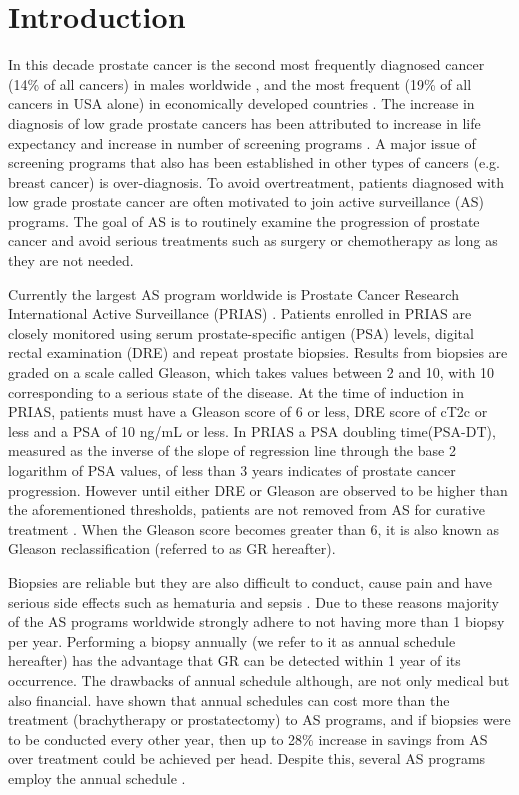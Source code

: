 \section{Introduction}
\label{sec : introduction}
In this decade prostate cancer is the second most frequently diagnosed cancer (14\% of all cancers) in males worldwide \citep{GlobalCancerStats2012}, and the most frequent (19\% of all cancers in USA alone) in economically developed countries \citep*{USACancerStats2017}. The increase in diagnosis of low grade prostate cancers has been attributed to increase in life expectancy and increase in number of screening programs \citep{potoskyPSAcancer}. A major issue of screening programs that also has been established in other types of cancers (e.g. breast cancer) is over-diagnosis. To avoid overtreatment, patients diagnosed with low grade prostate cancer are often motivated to join active surveillance (AS) programs. The goal of AS is to routinely examine the progression of prostate cancer and avoid serious treatments such as surgery or chemotherapy as long as they are not needed.

Currently the largest AS program worldwide is Prostate Cancer Research International Active Surveillance (PRIAS) \citep{bokhorst2015compliance}. Patients enrolled in PRIAS are closely monitored using serum prostate-specific antigen (PSA) levels, digital rectal examination (DRE) and repeat prostate biopsies. Results from biopsies are graded on a scale called Gleason, which takes values between 2 and 10, with 10 corresponding to a serious state of the disease. At the time of induction in PRIAS, patients must have a Gleason score of 6 or less, DRE score of cT2c or less and a PSA of 10 ng/mL or less. In PRIAS a PSA doubling time(PSA-DT), measured as the inverse of the slope of regression line through the base 2 logarithm of PSA values, of less than 3 years indicates of prostate cancer progression. However until either DRE or Gleason are observed to be higher than the aforementioned thresholds, patients are not removed from AS for curative treatment \citep{bokhorst2016decade}. When the Gleason score becomes greater than 6, it is also known as Gleason reclassification (referred to as GR hereafter).

Biopsies are reliable but they are also difficult to conduct, cause pain and have serious side effects such as hematuria and sepsis \citep{loeb2013systematic}. Due to these reasons majority of the AS programs worldwide strongly adhere to not having more than 1 biopsy per year. Performing a biopsy annually (we refer to it as annual schedule hereafter) has the advantage that GR can be detected within 1 year of its occurrence. The drawbacks of annual schedule although, are not only medical but also financial. \citet{keegan2012active} have shown that annual schedules can cost more than the treatment (brachytherapy or prostatectomy) to AS programs, and if biopsies were to be conducted every other year, then up to 28\% increase in savings from AS over treatment could be achieved per head. Despite this, several AS programs employ the annual schedule \citep{tosoian2011active,welty2015extended}.

